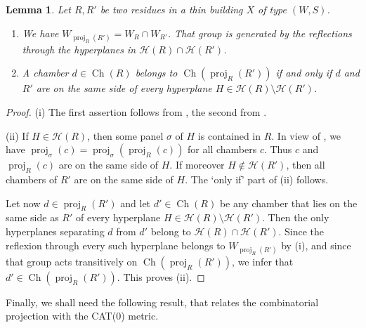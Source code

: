 \documentclass[12pt,a4paper]{amsproc}
\newtheorem{lemma}[theorem]{Lemma}
\theoremstyle{definition}
\DeclareMathOperator{\Ch}{Ch}
\DeclareMathOperator{\proj}{proj}
\begin{document}
\begin{lemma}\label{lem:proj_R(R')}
Let $R, R'$ be two residues in a thin building $X$ of type $(W, S)$.  
\begin{enumerate}[label=(\roman*)]
\item We have $W_{\proj_R(R')} = W_R \cap W_{R'}$. That group is generated by the reflections through the hyperplanes in $\mathcal H(R) \cap \mathcal H(R')$.

\item A chamber $d \in \Ch(R)$ belongs to $\Ch(\proj_R(R'))$ if and only if $d$ and $R'$ are on the same side of every hyperplane $H \in \mathcal H(R) \setminus \mathcal H(R')$. 

\end{enumerate}	
 
\end{lemma}
\begin{proof}
(i) The first assertion follows from \cite[Lemma~3.123]{AbramenkoBrown}, the second from  \cite[Lemma~2.3 and 2.7]{CapRAB}.

\medskip \noindent
(ii) If $H \in \mathcal H(R)$, then some panel $\sigma$ of $H$ is contained in $R$. In view of \cite[2.30.5]{Tits74}, we have $\proj_\sigma(c) = \proj_\sigma(\proj_R(c))$ for all chambers $c$. Thus $c$ and $\proj_R(c)$ are on the same side of $H$. If moreover $H \not \in \mathcal H(R')$, then all chambers of $R'$ are on the same side of $H$. The `only if' part of (ii) follows. 

Let now $d \in \proj_R(R')$ and let $d' \in \Ch(R)$ be any chamber that lies on the same side as $R'$ of every hyperplane $H \in \mathcal H(R) \setminus \mathcal H(R')$. Then the only hyperplanes separating $d$ from $d'$ belong to $\mathcal H(R) \cap \mathcal H(R')$. Since the reflexion through every such hyperplane belongs to $W_{\proj_R(R')}$ by (i), and since that group acts transitively on $\Ch(\proj_R(R'))$, we infer that $d' \in \Ch(\proj_R(R'))$. This proves (ii). 
\end{proof}
		




Finally, we shall need the following result, that relates the combinatorial projection with the CAT($0$) metric. 
\end{document}
